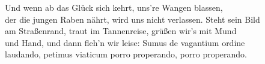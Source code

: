 \thestrophe Und wenn ab das Glück sich kehrt, uns're Wangen blassen, \\
der die jungen Raben nährt, wird uns nicht verlassen. Steht sein Bild \\
am Straßenrand, traut im Tannenreise, grüßen wir's mit Mund \\
und Hand, und dann fleh'n wir leise: Sumus de vagantium ordine \\
laudando, petimus viaticum porro properando, porro properando.